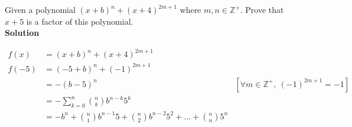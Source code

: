 \documentclass{article}
\begin{document}
\noindent Given a polynomial $(x+b)^n + (x+4)^{2m+1}$ where $m, n \in \mathbb{Z}^+$. Prove that $x + 5$ is a factor of this polynomial.\\

\noindent \textbf{Solution}

\begin{align*}
    f(x)  & = (x+b)^n + (x + 4)^{2m+1}                                                                                                                             \\
    f(-5) & = (-5 + b)^n + (-1)^{2m + 1}                                                                                                                           \\
          & = -(b-5)^n\                                                                            & \left[\forall m \in \mathbb{Z}^+,\ (-1)^{2m + 1} = -1 \right] \\
          & = -\sum_{k=0}^{n} \binom{n}{k} b^{n-k} 5^k                                                                                                             \\
          & = -b^n + \binom{n}{1} b^{n-1} 5 + \binom{n}{2} b^{n-2} 5^2 + \ldots + \binom{n}{n} 5^n                                                                 \\
\end{align*}
\end{document}
